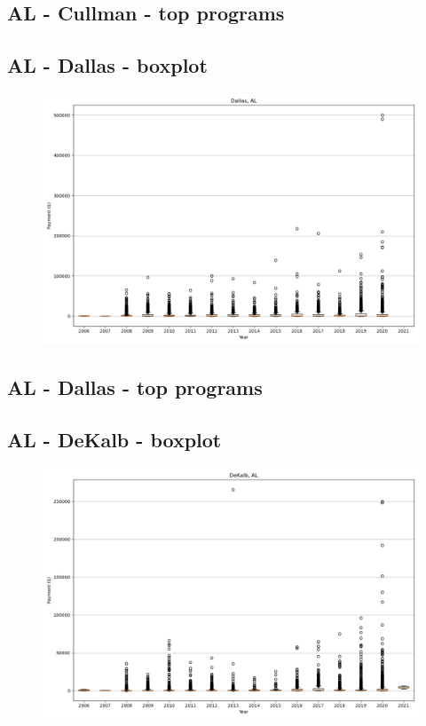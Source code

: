 \subsection*{AL - Cullman - top programs}

\newpage
\subsection*{AL - Dallas - boxplot}
\begin{figure}[h]
\centering
\includegraphics[width=7in]{../output/boxplots/counties/Dallas-AL_boxplot.png}
\end{figure}


\subsection*{AL - Dallas - top programs}

\newpage
\subsection*{AL - DeKalb - boxplot}
\begin{figure}[h]
\centering
\includegraphics[width=7in]{../output/boxplots/counties/DeKalb-AL_boxplot.png}
\end{figure}


